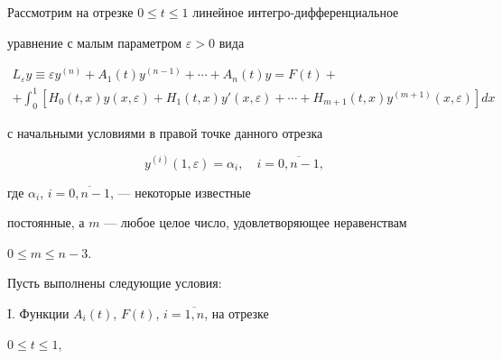 

\maketitle


\label{begin}











Рассмотрим на отрезке $0 \le t \le 1$ линейное интегро-дифференциальное 


уравнение с малым параметром $\varepsilon > 0$ вида


\begin{multline}


\label{eq1}


L_{\varepsilon}y\equiv \varepsilon y^{(n)}+A_{1}(t)y^{(n - 1)} + \dotsb


+ A_{n} (t)y = F(t) + \\ 


+ {\int_{0}^{1} {[H_{0} (t,x)y(x,\varepsilon ) + 


H_{1}(t,x){y}'(x,\varepsilon )+\dotsb+


H_{m+1}(t,x)y^{(m+1)}(x,\varepsilon)]dx}}  


\end{multline}


с начальными условиями в правой точке данного отрезка


\begin{equation}


\label{eq2}


y^{(i)}(1,\varepsilon)=\alpha_{i},\quad i = \overline {0,n-1},


\end{equation}


где $\alpha _{i}$, $i=\overline{0,n-1}$, --- некоторые известные 


постоянные, а $m$ --- любое целое число, удовлетворяющее неравенствам 


$0 \le m \le n - 3$. 





Пусть выполнены следующие условия:





I. Функции $A_{i}(t)$, $F(t)$, $i=\overline{1,n}$, на отрезке 


$0 \le t \le 1$, 


